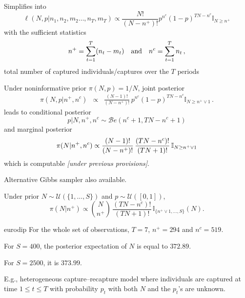 \begin{slide}
\end{slide}\begin{slide}

Simplifies into
$$
\ell(N,p|n_1,n_2,m_2\ldots,n_T,m_T) \propto \frac{N!}{(N-n^+)!}p^{n^c}(1-p)^{TN-n^c}\mathbb{I}_{N\geq n^+}
$$
with the sufficient statistics 
$$
n^+=\sum_{t=1}^{T}(n_t-m_t)
\quad\hbox{and}\quad
n^c=\sum_{t=1}^Tn_t\,,
$$
total number of captured individuals/captures over the $T$ periods

\end{slide}\begin{slide}

Under noninformative prior $\pi(N,p) = 1/N$, joint posterior 
\small\begin{eqnarray*}
\pi(N,p|n^+,n^c) & \propto & \frac{(N-1)!}{(N-n^+)!}\, p^{n^c} (1-p)^{TN-n^c}\mathbb{I}_{N\geq n^+\vee 1}\,.
\end{eqnarray*}\normalsize
leads to conditional posterior
\small$$
p|N,n^+,n^c \sim \mathscr{B}e(n^c+1,TN-n^c+1)
$$\normalsize
and marginal posterior 
\small$$
\pi(N|n^+,n^c) \propto {(N-1)! \over (N-n^+)!}\, { (TN-n^c)! \over (TN+1)!}\, \mathbb{I}_{N\ge n^+\vee 1}
$$\normalsize
which is computable {\em [under previous provisions]}.

\vs\pause
Alternative Gibbs sampler also available.
\end{slide}\begin{slide}

Under prior $N\sim\mathscr{U}(\{1,\ldots,S\})$ and $p\sim\mathscr{U}([0,1])$,
$$
\pi(N|n^+)\propto {N \choose n^+}\,\frac{(TN-n^c)!}{(TN+1)!}\,\mathbb{I}_{\{n^+\vee 1,\ldots,S\}}(N).
$$

\pause\begin{block}{{\sf eurodip}}
For the whole set of observations, $T=7$, $n^+=294$ and  $n^c=519$.

For $S=400$, the posterior expectation of $N$ is equal to $372.89$.

For $S=2500$, it is $373.99$.
\end{block}

\end{slide}\begin{slide} 

E.g., heterogeneous capture--recapture 
model where individuals are captured at time $1\le t\le T$ with 
probability $p_t$ with both $N$ and the $p_t$'s are unknown. 


\end{slide}
